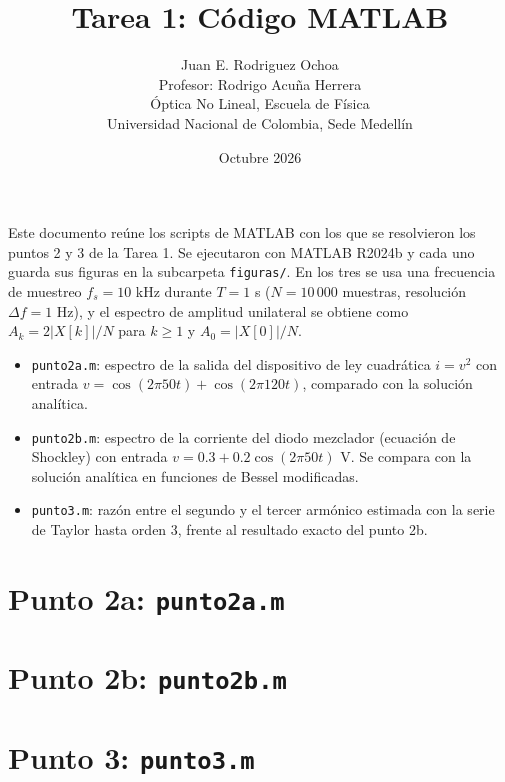 \documentclass{article}
\title{Tarea 1: Código MATLAB}
\author{Juan E. Rodriguez Ochoa\\
Profesor: Rodrigo Acuña Herrera\\
Óptica No Lineal, Escuela de Física\\
Universidad Nacional de Colombia, Sede Medellín}
\date{Octubre 2026}
\begin{document}
\maketitle

Este documento reúne los scripts de MATLAB con los que se resolvieron los puntos 2 y 3 de la
Tarea 1. Se ejecutaron con MATLAB R2024b y cada uno guarda sus figuras en la subcarpeta
\texttt{figuras/}. En los tres se usa una frecuencia de muestreo $f_s=10$ kHz durante $T=1$ s
($N=10\,000$ muestras, resolución $\Delta f=1$ Hz), y el espectro de amplitud unilateral se obtiene como
$A_k=2|X[k]|/N$ para $k\ge1$ y $A_0=|X[0]|/N$.

\begin{itemize}
  \item \texttt{punto2a.m}: espectro de la salida del dispositivo de ley cuadrática $i=v^2$ con
  entrada $v=\cos(2\pi50t)+\cos(2\pi120t)$, comparado con la solución analítica.
  \item \texttt{punto2b.m}: espectro de la corriente del diodo mezclador
  (ecuación de Shockley) con entrada $v=0.3+0.2\cos(2\pi50t)$ V. Se compara con la solución
  analítica en funciones de Bessel modificadas.
  \item \texttt{punto3.m}: razón entre el segundo y el tercer armónico estimada con la serie de
  Taylor hasta orden 3, frente al resultado exacto del punto 2b.
\end{itemize}

\newpage
\section{Punto 2a: \texttt{punto2a.m}}


\newpage
\section{Punto 2b: \texttt{punto2b.m}}


\newpage
\section{Punto 3: \texttt{punto3.m}}

\end{document}
